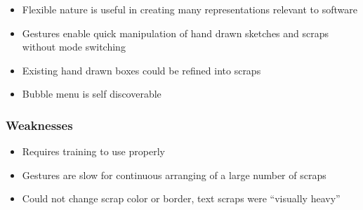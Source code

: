 \begin{itemize}
	\item Flexible nature is useful in creating many representations relevant to software
	\item Gestures enable quick manipulation of hand drawn sketches and scraps without mode switching
	\item Existing hand drawn boxes could be refined into scraps
	\item Bubble menu is self discoverable
\end{itemize}

\subsubsection{Weaknesses}
\begin{itemize}
	\item Requires training to use properly
	\item Gestures are slow for continuous arranging of a large number of scraps
	\item Could not change scrap color or border, text scraps were ``visually heavy''
\end{itemize}

%
%	
%
%
%
%
%




